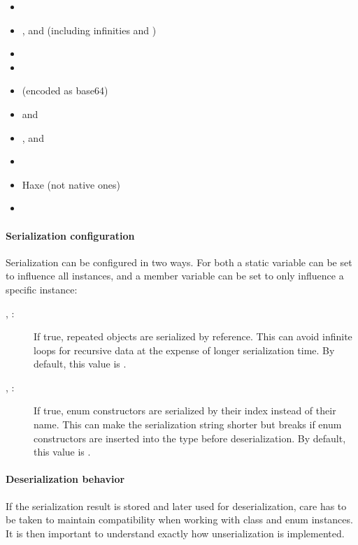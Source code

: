 \begin{itemize}
	\item {}
	\item {},  and  (including infinities and )
	\item {}
	\item {}
	\item {} (encoded as base64)
	\item {} and 
	\item {},  and 
	\item {}
	\item Haxe  (not native ones)
	\item {}
\end{itemize}

\paragraph{Serialization configuration}

Serialization can be configured in two ways. For both a static variable can be set to influence all  instances, and a member variable can be set to only influence a specific instance:

\begin{description}
	\item[, :] If true, repeated objects are serialized by reference. This can avoid infinite loops for recursive data at the expense of longer serialization time. By default, this value is .
	\item[, :] If true, enum constructors are serialized by their index instead of their name. This can make the serialization string shorter but breaks if enum constructors are inserted into the type before deserialization. By default, this value is .
\end{description}

\paragraph{Deserialization behavior}

If the serialization result is stored and later used for deserialization, care has to be taken to maintain compatibility when working with class and enum instances. It is then important to understand exactly how unserialization is implemented.

